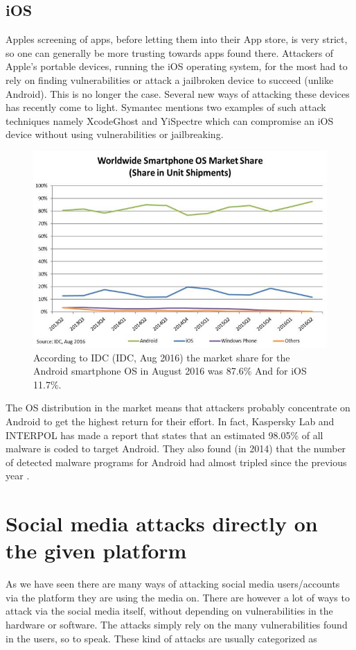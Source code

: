 \subsection{iOS}
Apples screening of apps, before letting them into their App store, is very strict, so one can generally be more trusting towards apps found there. Attackers of Apple’s portable devices, running the iOS operating system, for the most had to rely on finding vulnerabilities or attack a jailbroken device to succeed (unlike Android). This is no longer the case. Several new ways of attacking these devices has recently come to light. Symantec mentions two examples of such attack techniques namely XcodeGhost and YiSpectre which can compromise an iOS device without using vulnerabilities or jailbreaking.
\begin{figure}
\centering
\includegraphics[width=0.8 \textwidth]{fig/smartphone_market_share}
\caption{According to IDC (IDC, Aug 2016) the market share for the Android smartphone OS in August 2016 was 87.6\% And for iOS 11.7\%.\label{fig:smartphone_market_share}}
\end{figure}
The OS distribution in the market means that attackers probably concentrate on Android to get the highest return for their effort. In fact, Kaspersky Lab and INTERPOL has made a report that states that an estimated 98.05\% of all malware is coded to target Android. They also found (in 2014) that the number of detected malware programs for Android had almost tripled since the previous year \cite{Kaspersky2014}. 
\section{Social media attacks directly on the given platform}
As we have seen there are many ways of attacking social media users/accounts via the platform they are using the media on. There are however a lot of ways to attack via the social media itself, without depending on vulnerabilities in the hardware or software. The attacks simply rely on the many vulnerabilities found in the users, so to speak. These kind of attacks are usually categorized as 
